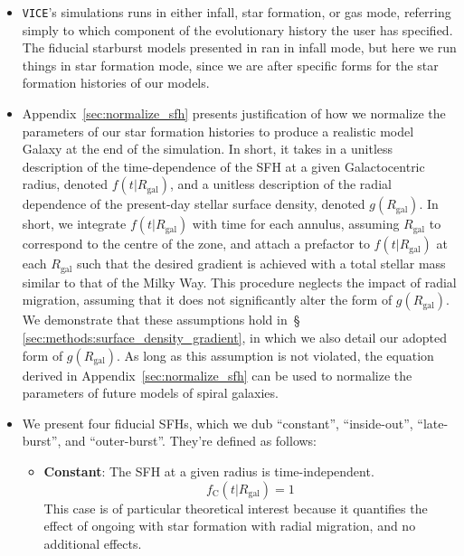 \documentclass[fleqn, usenatbib]{mnras}
\begin{document}
\begin{itemize} 
	\item \texttt{VICE}'s simulations runs in either infall, star formation, or 
	gas mode, referring simply to which component of the evolutionary history 
	the user has specified. The fiducial starburst models presented in 
	\citet{Johnson2020} ran in infall mode, but here we run things in star 
	formation mode, since we are after specific forms for the star formation 
	histories of our models. 

	\item Appendix~\ref{sec:normalize_sfh} presents justification of how we 
	normalize the parameters of our star formation histories to produce a 
	realistic model Galaxy at the end of the simulation. In short, it takes in 
	a unitless description of the time-dependence of the SFH at a given 
	Galactocentric radius, denoted $f(t|R_\text{gal})$, and a unitless 
	description of the radial dependence of the present-day stellar surface 
	density, denoted $g(R_\text{gal})$. In short, we integrate 
	$f(t|R_\text{gal})$ with time for each annulus, assuming $R_\text{gal}$ to 
	correspond to the centre of the zone, and attach a prefactor to 
	$f(t|R_\text{gal})$ at each $R_\text{gal}$ such that the desired gradient 
	is achieved with a total stellar mass similar to that of the Milky Way. 
	This procedure neglects the impact of radial migration, assuming that it 
	does not significantly alter the form of $g(R_\text{gal})$. We demonstrate 
	that these assumptions hold in~\S 
	\ref{sec:methods:surface_density_gradient}, in which we also detail our 
	adopted form of $g(R_\text{gal})$. As long as this assumption is not 
	violated, the equation derived in Appendix~\ref{sec:normalize_sfh} can be 
	used to normalize the parameters of future models of spiral galaxies. 

	\item We present four fiducial SFHs, which we dub ``constant'', 
	``inside-out'', ``late-burst'', and ``outer-burst''. They're defined as 
	follows: 
	\begin{itemize} 
		\item \textbf{Constant}: The SFH at a given radius is time-independent. 
		\begin{equation} 
		f_\text{C}(t|R_\text{gal}) = 1 
		\label{eq:constant_sfh} 
		\end{equation} 
		This case is of particular theoretical interest because it quantifies 
		the effect of ongoing with star formation with radial migration, and 
		no additional effects. 


\end{itemize}
\end{itemize}
\end{document}

